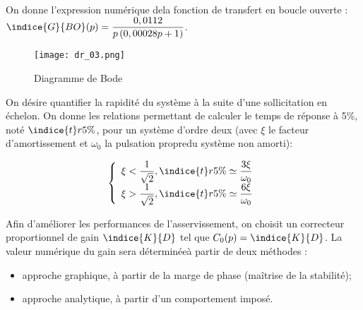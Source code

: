   On donne l’expression numérique dela fonction de transfert en boucle ouverte :
  $\indice{G}{BO}(p)=\dfrac{0,0112}{p\left( 0,00028 p +1\right)}$.


\begin{figure}[!h]
\centering
\texttt{[image: dr\_03.png]}
\caption{Diagramme de Bode \label{dr_03}}
\end{figure}

 On désire quantifier la rapidité du système à la suite d’une sollicitation en échelon. On donne les 
relations permettant de calculer le temps de réponse à 5\%, noté $\indice{t}{r5\%}$, pour un système d’ordre deux (avec $\xi$ le facteur d’amortissement et $\omega_0$ la pulsation propredu système non amorti):

$$
\left\{ 
\begin{array}{l}
\xi < \dfrac{1}{\sqrt{2}}, \indice{t}{r5\%} \simeq \dfrac{3\xi}{ \omega_0} \\
\xi > \dfrac{1}{\sqrt{2}}, \indice{t}{r5\%} \simeq \dfrac{6\xi }{\omega_0} \\
\end{array}
\right.
$$ 



Afin d’améliorer les performances de l’asservissement, on choisit un correcteur proportionnel de gain 
$\indice{K}{D}$ tel que $C_0(p) = \indice{K}{D}$. La valeur numérique du gain sera déterminéeà partir de deux méthodes :
\begin{itemize}
\item approche graphique, à partir de la marge de phase (maîtrise de la stabilité);
\item approche analytique, à partir d’un comportement imposé.
\end{itemize}


